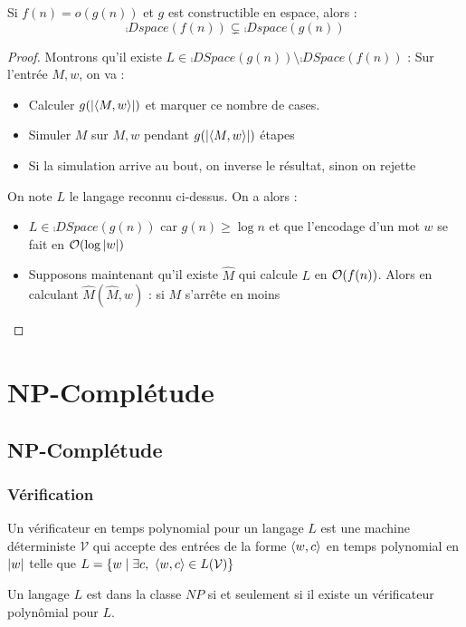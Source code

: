\documentclass{cours}
\begin{document}
\begin{theorem}
    Si $f(n) = o(g(n))$ et $g$ est constructible en espace, alors : 
    \[
        \comp{Dspace}(f(n)) \subsetneq \comp{Dspace}(g(n))
    \]
\end{theorem}
\begin{proof}
    Montrons qu'il existe $L \in \comp{DSpace}(g(n)) \setminus \comp{DSpace}(f(n))$ : Sur l'entrée $M, w$, on va : 
    \begin{itemize}
        \item Calculer $g(\left|\left\langle M, w \right\rangle\right|)$ et marquer ce nombre de cases.
        \item Simuler $M$ sur $M, w$ pendant $g(\left|\left\langle M, w \right\rangle\right|)$ étapes
        \item Si la simulation arrive au bout, on inverse le résultat, sinon on rejette
    \end{itemize}
    On note $L$ le langage reconnu ci-dessus. On a alors : 
    \begin{itemize}
        \item $L \in \comp{DSpace}(g(n))$ car $g(n) \geq \log n$ et que l'encodage d'un mot $w$ se fait en $\mathcal{O}(\log \left|w\right|)$
        \item Supposons maintenant qu'il existe $\hat{M}$ qui calcule $L$ en $\mathcal{O}(f(n))$. Alors en calculant $\hat{M}(\hat{M}, w)$ : si $M$ s'arrête en moins   
    \end{itemize}
\end{proof}

\section{NP-Complétude}
\subsection{NP-Complétude}

\subsubsection{Vérification}
\begin{definition}
    Un vérificateur en temps polynomial pour un langage $L$ est une machine déterministe $\mathcal{V}$ qui accepte des entrées de la forme $\left\langle w, c \right\rangle$ en temps polynomial en $\left|w\right|$ telle que $L = \left\{w \mid \exists c, \ \left\langle w, c \right\rangle \in L(\mathcal{V})\right\}$
\end{definition}

\begin{theorem}
    Un langage $L$ est dans la classe $NP$ si et seulement si il existe un vérificateur polynômial pour $L$. 
\end{theorem}
\end{document}
